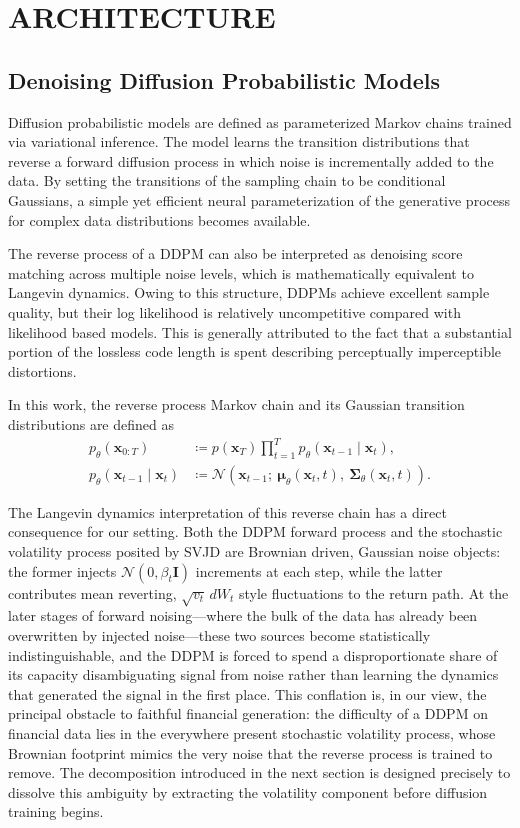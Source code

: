 \documentclass[sigconf,natbib=false]{acmart}
\begin{document}
\section{ARCHITECTURE}
\subsection{Denoising Diffusion Probabilistic Models}

Diffusion probabilistic models are defined as parameterized Markov chains trained via variational inference. The model learns the transition distributions that reverse a forward diffusion process in which noise is incrementally added to the data. By setting the transitions of the sampling chain to be conditional Gaussians, a simple yet efficient neural parameterization of the generative process for complex data distributions becomes available.

The reverse process of a DDPM can also be interpreted as denoising score matching across multiple noise levels, which is mathematically equivalent to Langevin dynamics. Owing to this structure, DDPMs achieve excellent sample quality, but their log likelihood is relatively uncompetitive compared with likelihood based models. This is generally attributed to the fact that a substantial portion of the lossless code length is spent describing perceptually imperceptible distortions.

In this work, the reverse process Markov chain and its Gaussian transition distributions are defined as
\begin{align}
    p_{\theta}(\mathbf{x}_{0:T}) &\coloneqq p(\mathbf{x}_T) \prod_{t=1}^{T} p_{\theta}(\mathbf{x}_{t-1} \mid \mathbf{x}_t), \label{eq:reverse_process} \\
    p_{\theta}(\mathbf{x}_{t-1} \mid \mathbf{x}_t) &\coloneqq \mathcal{N} \left( \mathbf{x}_{t-1};\ \boldsymbol{\mu}_{\theta}(\mathbf{x}_t, t),\ \boldsymbol{\Sigma}_{\theta}(\mathbf{x}_t, t) \right). \label{eq:transition_dist}
\end{align}

The Langevin dynamics interpretation of this reverse chain has a direct consequence for our setting. Both the DDPM forward process and the stochastic volatility process posited by SVJD are Brownian driven, Gaussian noise objects: the former injects $\mathcal{N}(0, \beta_t \mathbf{I})$ increments at each step, while the latter contributes mean reverting, $\sqrt{v_t}\,dW_t$ style fluctuations to the return path. At the later stages of forward noising---where the bulk of the data has already been overwritten by injected noise---these two sources become statistically indistinguishable, and the DDPM is forced to spend a disproportionate share of its capacity disambiguating signal from noise rather than learning the dynamics that generated the signal in the first place. This conflation is, in our view, the principal obstacle to faithful financial generation: the difficulty of a DDPM on financial data lies in the everywhere present stochastic volatility process, whose Brownian footprint mimics the very noise that the reverse process is trained to remove. The decomposition introduced in the next section is designed precisely to dissolve this ambiguity by extracting the volatility component before diffusion training begins.
\end{document}
